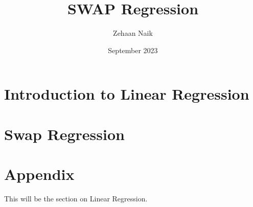 \documentclass[11pt]{article}
\title{SWAP Regression}
\author{Zehaan Naik}
\date{September 2023}
\begin{document}
\maketitle

\section{Introduction to Linear Regression}
\section{Swap Regression}
\section{Appendix}

\pagebreak

This will be the section on Linear Regression.
\end{document}
